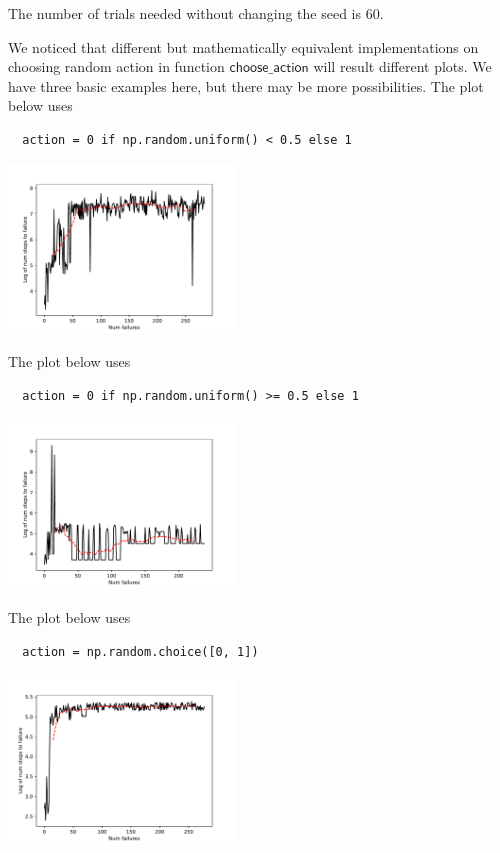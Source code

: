 \begin{answer}

  The number of trials needed without changing the seed is 60.
  
  \color{Comments}We noticed that different but mathematically equivalent implementations on choosing random action in function $\mathsf{choose\_action}$ will result different plots. We have three basic examples here, but there may be more possibilities. The plot below uses
  \begin{verbatim}
  action = 0 if np.random.uniform() < 0.5 else 1
  \end{verbatim}

  \begin{center}
    \includegraphics[width=6cm]{../src/cartpole/control_case1.pdf}
  \end{center}

  The plot below uses
  \begin{verbatim}
  action = 0 if np.random.uniform() >= 0.5 else 1
  \end{verbatim}
  \begin{center}
  	\includegraphics[width=6cm]{../src/cartpole/control_case2.pdf}
  \end{center}

  The plot below uses
  \begin{verbatim}
  action = np.random.choice([0, 1])
  \end{verbatim}
  \begin{center}
  	\includegraphics[width=6cm]{../src/cartpole/control_case3.pdf}
  \end{center}

\end{answer}
